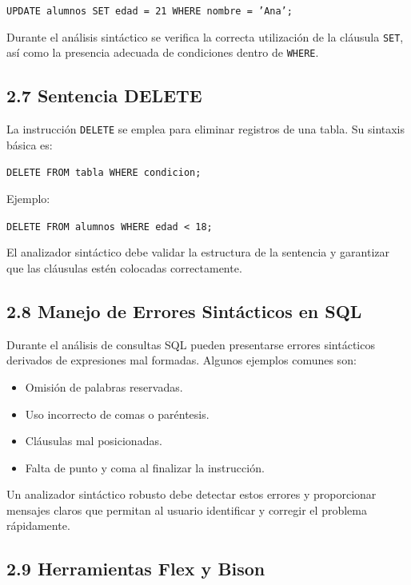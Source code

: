 \documentclass{article}
\begin{document}
\begin{center}
\texttt{UPDATE alumnos SET edad = 21 WHERE nombre = 'Ana';}
\end{center}

Durante el análisis sintáctico se verifica la correcta utilización de la cláusula \texttt{SET}, así como la presencia adecuada de condiciones dentro de \texttt{WHERE}.

\subsection{2.7 Sentencia DELETE}

La instrucción \texttt{DELETE} se emplea para eliminar registros de una tabla. Su sintaxis básica es:

\begin{center}
\texttt{DELETE FROM tabla WHERE condicion;}
\end{center}

Ejemplo:

\begin{center}
\texttt{DELETE FROM alumnos WHERE edad < 18;}
\end{center}

El analizador sintáctico debe validar la estructura de la sentencia y garantizar que las cláusulas estén colocadas correctamente.

\subsection{2.8 Manejo de Errores Sintácticos en SQL}

Durante el análisis de consultas SQL pueden presentarse errores sintácticos derivados de expresiones mal formadas. Algunos ejemplos comunes son:
\begin{itemize}
\item Omisión de palabras reservadas.
\item Uso incorrecto de comas o paréntesis.
\item Cláusulas mal posicionadas.
\item Falta de punto y coma al finalizar la instrucción.
\end{itemize}

Un analizador sintáctico robusto debe detectar estos errores y proporcionar mensajes claros que permitan al usuario identificar y corregir el problema rápidamente. \\


\subsection{2.9 Herramientas Flex y Bison}
\end{document}
